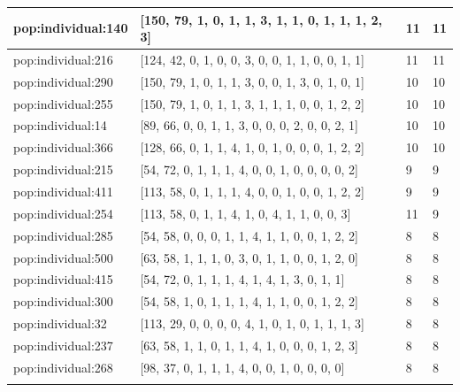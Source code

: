 \begin{table}
\begin{tabular}{p{3cm} p{4cm} p{3cm} p{3cm}}
\small{pop:individual:140} & \small{[150, 79, 1, 0, 1, 1, 3, 1, 1, 0, 1, 1, 1, 2, 3]} 
& \small{11} & \small{11}\\ \hline 
\small{pop:individual:216} & \small{[124, 42, 0, 1, 0, 0, 3, 0, 0, 1, 1, 0, 0, 1, 1]} 
& \small{11} & \small{11}\\ \hline 
\small{pop:individual:290} & \small{[150, 79, 1, 0, 1, 1, 3, 0, 0, 1, 3, 0, 1, 0, 1]} 
& \small{10} & \small{10}\\ \hline 
\small{pop:individual:255} & \small{[150, 79, 1, 0, 1, 1, 3, 1, 1, 1, 0, 0, 1, 2, 2]} 
& \small{10} & \small{10}\\ \hline 
\small{pop:individual:14} & \small{[89, 66, 0, 0, 1, 1, 3, 0, 0, 0, 2, 0, 0, 2, 1]} 
& \small{10} & \small{10}\\ \hline 
\small{pop:individual:366} & \small{[128, 66, 0, 1, 1, 4, 1, 0, 1, 0, 0, 0, 1, 2, 2]} 
& \small{10} & \small{10}\\ \hline 
\small{pop:individual:215} & \small{[54, 72, 0, 1, 1, 1, 4, 0, 0, 1, 0, 0, 0, 0, 2]} 
& \small{9} & \small{9}\\ \hline 
\small{pop:individual:411} & \small{[113, 58, 0, 1, 1, 1, 4, 0, 0, 1, 0, 0, 1, 2, 2]} 
& \small{9} & \small{9}\\ \hline 
\small{pop:individual:254} & \small{[113, 58, 0, 1, 1, 4, 1, 0, 4, 1, 1, 0, 0, 3]} 
& \small{11} & \small{9}\\ \hline 
\small{pop:individual:285} & \small{[54, 58, 0, 0, 0, 1, 1, 4, 1, 1, 0, 0, 1, 2, 2]} 
& \small{8} & \small{8}\\ \hline 
\small{pop:individual:500} & \small{[63, 58, 1, 1, 1, 0, 3, 0, 1, 1, 0, 0, 1, 2, 0]} 
& \small{8} & \small{8}\\ \hline 
\small{pop:individual:415} & \small{[54, 72, 0, 1, 1, 1, 4, 1, 4, 1, 3, 0, 1, 1]} 
& \small{8} & \small{8}\\ \hline 
\small{pop:individual:300} & \small{[54, 58, 1, 0, 1, 1, 1, 4, 1, 1, 0, 0, 1, 2, 2]} 
& \small{8} & \small{8}\\ \hline 
\small{pop:individual:32} & \small{[113, 29, 0, 0, 0, 0, 4, 1, 0, 1, 0, 1, 1, 1, 3]} 
& \small{8} & \small{8}\\ \hline 
\small{pop:individual:237} & \small{[63, 58, 1, 1, 0, 1, 1, 4, 1, 0, 0, 0, 1, 2, 3]} 
& \small{8} & \small{8}\\ \hline  
\small{pop:individual:268} & \small{[98, 37, 0, 1, 1, 1, 4, 0, 0, 1, 0, 0, 0, 0]} 
& \small{8} & \small{8}\\ \hline   
\noalign{\smallskip}\hline
\end{tabular}
\end{table}

